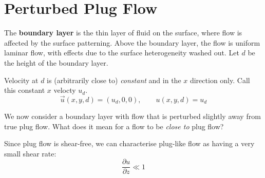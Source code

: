 \documentclass[a4paper]{report}
\begin{document}
\begin{center}
\end{center}


\section*{Perturbed Plug Flow}

The \textbf{boundary layer} is the thin layer of fluid on the surface, where flow is affected by the surface patterning.  Above the boundary layer, the flow is uniform laminar flow, with effects due to the surface heterogeneity washed out.
Let $d$ be the height of the boundary layer.

Velocity at $d$ is (arbitrarily close to) \emph{constant} and in the $x$ direction only.  Call this constant $x$ velocty $u_d$.
\begin{equation}
\vec{u}(x,y,d) = (u_d,0,0), \qquad u(x,y,d) = u_d
\end{equation}

\vspace{1em}

We now consider a boundary layer with flow that is perturbed slightly away from true plug flow.  What does it mean for a flow to be \emph{close to} plug flow?

Since plug flow is shear-free, we can characterise plug-like flow as having a very small shear rate:
\begin{equation}
\frac{\partial u}{\partial z} \ll 1
\end{equation}

\vspace{1em}

\begin{center}
\end{center}
\end{document}
